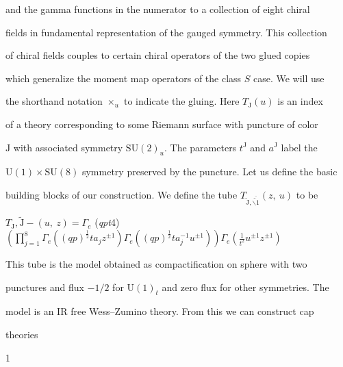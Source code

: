 \documentclass[a4paper,12pt]{article}
\begin{document}
and the gamma functions in the numerator to a collection of eight chiral

fields in fundamental representation of the gauged symmetry. This collection

of chiral fields couples to certain chiral operators of the two glued copies

which generalize the moment map operators of the class $S$ case. We will use

the shorthand notation $\times_{u}$ to indicate the gluing. Here $T_{\mathrm{J}}(u)$ is an index

of a theory corresponding to some Riemann surface with puncture of color

$\mathrm{J}$ with associated symmetry $\mathrm{S}\mathrm{U}(2)_{u}$. The parameters $t^{\mathrm{J}}$ and $a^{\mathrm{J}}$ label the

$\mathrm{U}(1) \times \mathrm{S}\mathrm{U}(8)$ symmetry preserved by the puncture. Let us define the basic

building blocks of our construction. We define the tube $T_{\tilde{\mathrm{J}},\overline{\tilde{\backslash 1}}}(z,\ u)$ to be

$T_{\mathrm{J}},\tilde{\mathrm{J}}-(u,\ z)=\Gamma_{e}$ ({\it qpt}4) $(\displaystyle \prod_{j=1}^{8}\Gamma_{e}((qp)^{\frac{1}{2}}ta_{j}z^{\pm 1})\Gamma_{e}((qp)^{\frac{1}{2}}ta_{j}^{-1}u^{\pm 1})) \displaystyle \Gamma_{e}(\frac{1}{t^{2}}u^{\pm 1}z^{\pm 1})$

This tube is the model obtained as compactification on sphere with two

punctures and flux $-1/2$ for $\mathrm{U}(1)_{t}$ and zero flux for other symmetries. The

model is an IR free Wess–Zumino theory. From this we can construct cap

theories

1
\end{document}
